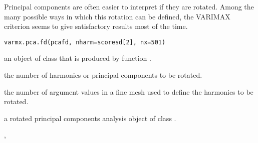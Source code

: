 \documentclass{article}
\begin{document}
\begin{Description}\relax
Principal components are often easier to interpret if they are
rotated.  Among the many possible ways in which this rotation can be
defined, the VARIMAX criterion seems to give satisfactory results most
of the time.
\end{Description}
\begin{Usage}
\begin{verbatim}
varmx.pca.fd(pcafd, nharm=scoresd[2], nx=501)
\end{verbatim}
\end{Usage}
\begin{Arguments}
\begin{ldescription}
\item[\code{pcafd}] an object of class  that is produced by function
.

\item[\code{nharm}] the number of harmonics or principal components to be
rotated.

\item[\code{nx}] the number of argument values in a fine mesh
used to define the harmonics to be
rotated.

\end{ldescription}
\end{Arguments}
\begin{Value}
a rotated principal components analysis object of class
.
\end{Value}
\begin{SeeAlso}\relax
{}, 
\end{SeeAlso}
\end{document}
